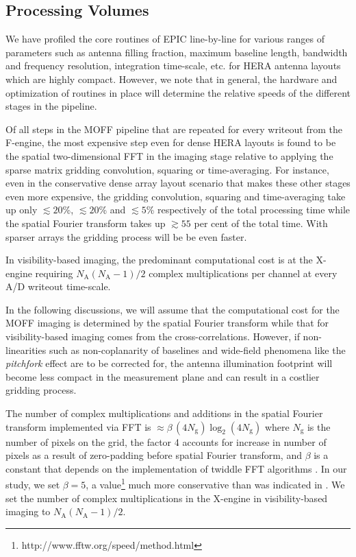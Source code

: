 \documentclass[a4paper,fleqn,usenatbib]{mnras}
\newcommand{\Nant}{N_\textrm{A}}
\newcommand{\Ngrid}{N_\textrm{g}}
\begin{document}
\subsection{Processing Volumes}

We have profiled the core routines of EPIC line-by-line for various ranges of 
parameters such as antenna filling fraction, maximum baseline length, bandwidth 
and frequency resolution, integration time-scale, etc. for HERA antenna layouts 
which are highly compact. However, we note that in general, the hardware and 
optimization of routines in place will determine the relative speeds of the 
different stages in the pipeline. 

Of all steps in the MOFF pipeline that are repeated for every writeout from 
the F-engine, the most expensive step even for dense HERA layouts is found to be 
the spatial two-dimensional FFT in the imaging stage relative to applying the 
sparse matrix gridding convolution, squaring or time-averaging. For instance, 
even in the conservative dense array layout scenario that makes these other 
stages even more expensive, the gridding convolution, squaring and time-averaging 
take up only $\lesssim 20$\%, $\lesssim 20$\% and $\lesssim 5$\% respectively 
of the total processing time while the spatial Fourier transform takes up 
$\gtrsim 55$ per cent of the total time. With sparser arrays the gridding process 
will be be even faster. 

In visibility-based imaging, the predominant computational cost is at the 
X-engine requiring $\Nant(\Nant-1)/2$ complex multiplications per channel at 
every A/D writeout time-scale. 

In the following discussions, we will assume that the computational cost for the MOFF imaging is determined by the spatial Fourier transform while that for visibility-based imaging comes from the cross-correlations. However, if non-linearities such as non-coplanarity of baselines \citep{cor08} and wide-field phenomena like the {\it pitchfork} effect \citep{thy15a,thy15b} are to be corrected for, the antenna illumination footprint will become less compact in the measurement plane and can result in a costlier gridding process.

The number of complex multiplications and additions in the spatial Fourier 
transform implemented via FFT is $\approx \beta\,(4\Ngrid)\log_2(4\Ngrid)$ 
where $\Ngrid$ is the number of pixels on the grid, the factor 4 accounts for 
increase in number of pixels as a result of zero-padding before spatial Fourier 
transform, and $\beta$ is a constant that depends on the implementation of 
twiddle FFT algorithms \citep{bri74}. In our study, we set $\beta=5$, a 
value\footnote{http://www.fftw.org/speed/method.html} much more conservative 
than was indicated in \citet{mor11}. We set the number of complex 
multiplications in the X-engine in visibility-based imaging to 
$\Nant(\Nant-1)/2$.
\end{document}
